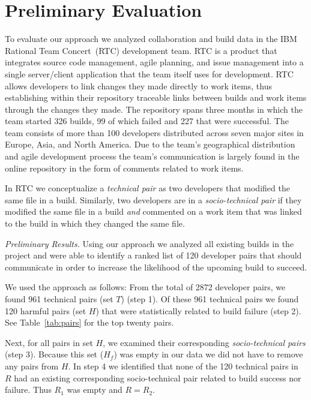 \section{Preliminary Evaluation}
To evaluate our approach we analyzed collaboration and build data in the IBM Rational Team Concert\texttrademark\ (RTC) development team.
RTC is a product that integrates source code management, agile planning, and issue management into a single server/client application that the team itself uses for development.
RTC allows developers to link changes they made directly to work items, thus establishing within their repository traceable links between builds and work items through the changes they made.
The repository spans three months in which the team started 326 builds, 99 of which failed and 227 that were successful. 
The team consists of more than 100 developers distributed across seven major sites in Europe, Asia, and North America. Due to the team's geographical distribution and agile development process the team's  communication is largely found in the online repository in the form of comments related to work items. 


In RTC we conceptualize a \emph{technical pair} as two developers that modified the same file in a build.
Similarly, two developers are in a \emph{socio-technical pair} if they modified the same file in a build \emph{and} commented on a work item that was linked to the build in which they changed the same file.



\emph{Preliminary Results.}
Using our approach we analyzed all existing builds in the project and were able to identify a ranked list of 120 developer pairs that should communicate in order to increase the likelihood of the upcoming build to succeed. 

We used the approach as follows: From the total of 2872 developer pairs, we found 961 technical pairs (set $T$) (step 1).
Of these 961 technical pairs we found 120 harmful pairs (set $H$) that were statistically related to build failure (step 2). See Table~\ref{tab:pairs} for the top twenty  pairs.

Next, for all pairs in set $H$, we examined their corresponding \emph{socio-technical pairs} (step 3). Because this set ($H_f$) was empty in our data we did not have to remove any pairs from $H$. 
In step 4 we identified that none of the 120 technical pairs in $R$ had an existing corresponding socio-technical pair related to build success nor failure. Thus $R_1$ was empty and $R=R_2$. 

